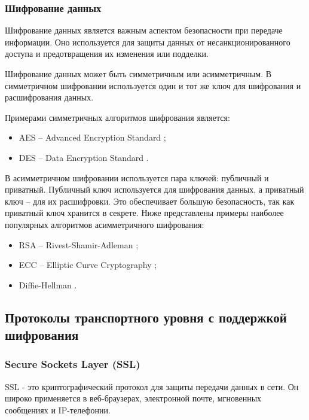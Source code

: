 \subsubsection{Шифрование данных}

Шифрование данных является важным аспектом безопасности при передаче информации. Оно используется для защиты данных от несанкционированного доступа и предотвращения их изменения или подделки.

Шифрование данных может быть симметричным или асимметричным. В симметричном шифровании используется один и тот же ключ для шифрования и расшифрования данных.

Примерами симметричных алгоритмов шифрования является:

\begin{itemize}
	\item AES -- Advanced Encryption Standard \cite{AES};
	\item DES -- Data Encryption Standard \cite{DES}.
\end{itemize}

В асимметричном шифровании используется пара ключей: публичный и приватный. Публичный ключ используется для шифрования данных, а приватный ключ -- для их расшифровки. Это обеспечивает большую безопасность, так как приватный ключ хранится в секрете. Ниже представлены примеры наиболее популярных алгоритмов асимметричного шифрования:

\begin{itemize}
	\item RSA -- Rivest-Shamir-Adleman \cite{RSA};
	\item ECC -- Elliptic Curve Cryptography \cite{RSA};
	\item Diffie-Hellman \cite{RSA}. 
\end{itemize}

\subsection{Протоколы транспортного уровня с поддержкой шифрования}

\subsubsection{Secure Sockets Layer (SSL)}

SSL - это криптографический протокол для защиты передачи данных в сети. Он широко применяется в веб-браузерах, электронной почте, мгновенных сообщениях и IP-телефонии.

